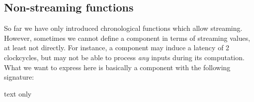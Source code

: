 \subsection{Non-streaming functions}
So far we have only introduced chronological functions which allow streaming. 
However, sometimes we cannot define a component in terms of streaming values, at least not directly.
For instance, a component may induce a latency of 2 clockcycles, but may not be able to process \textit{any} inputs during its computation.
What we want to express here is basically a component with the following signature:
\begin{texexp}{text only}
\begin{hscode}\SaveRestoreHook
{}%
%
\>[B]{}\mathbin{::}\langle{}\rangle\to {}\langle{}\mathbin{+}\rangle{}\<[E]%
\\
\>[B]{}\mathrel{=}\<[E]%
\ColumnHook
\end{hscode}\resethooks
\end{texexp}

